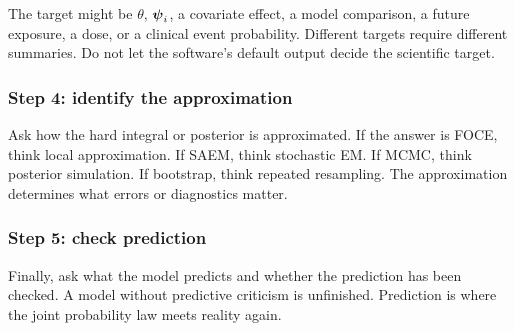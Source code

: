 The target might be \(\theta\), \(\boldsymbol{\psi}_i\), a covariate effect, a model comparison, a future exposure, a dose, or a clinical event probability.  Different targets require different summaries.  Do not let the software's default output decide the scientific target.

\subsubsection*{Step 4: identify the approximation}

Ask how the hard integral or posterior is approximated.  If the answer is FOCE, think local approximation.  If SAEM, think stochastic EM.  If MCMC, think posterior simulation.  If bootstrap, think repeated resampling.  The approximation determines what errors or diagnostics matter.

\subsubsection*{Step 5: check prediction}

Finally, ask what the model predicts and whether the prediction has been checked.  A model without predictive criticism is unfinished.  Prediction is where the joint probability law meets reality again.
